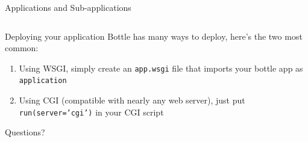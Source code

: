\documentclass{lug}
\begin{document}
\begin{frame}{Applications and Sub-applications}
    \small
    \inputminted{python3}{examples/apps.py}
\end{frame}

\begin{frame}{Deploying your application}
    Bottle has many ways to deploy, here's the two most common:

    \begin{enumerate}
        \item Using WSGI, simply create an \texttt{app.wsgi} file that imports
            your bottle app as \texttt{application}
        \item Using CGI (compatible with nearly any web server), just put
            \texttt{run(server='cgi')} in your CGI script
    \end{enumerate}
\end{frame}

\begin{frame}[standout]
    \Huge
    Questions?
\end{frame}
\end{document}
